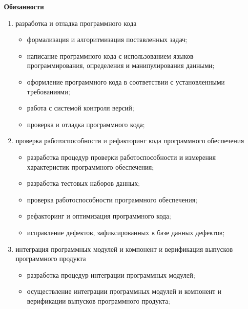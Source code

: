 \documentclass[a4paper]{article}
\begin{document}
		\textbf{Обязанности}
		\begin{enumerate}
			\item разработка и отладка программного кода
			\begin{itemize}
				\item формализация и алгоритмизация поставленных задач;
				
				\item написание программного кода с использованием языков программирования, определения и манипулирования данными;
				
				\item оформление программного кода в соответствии с установленными требованиями;
				
				\item работа с системой контроля версий;
				
				\item проверка и отладка программного кода;
			\end{itemize}
			
			\item проверка работоспособности и рефакторинг кода программного обеспечения
			\begin{itemize}
				\item разработка процедур проверки работоспособности и измерения характеристик программного обеспечения;
				
				\item разработка тестовых наборов данных;
				
				\item проверка работоспособности программного обеспечения;
				
				\item рефакторинг и оптимизация программного кода;
				
				\item исправление дефектов, зафиксированных в базе данных дефектов;
			\end{itemize}
			
			\item интеграция программных модулей и компонент и верификация выпусков программного продукта
			\begin{itemize}
				\item разработка процедур интеграции программных модулей;
				
				\item осуществление интеграции программных модулей и компонент и верификации выпусков программного продукта;
			\end{itemize}
			

\end{enumerate}
\end{document}
